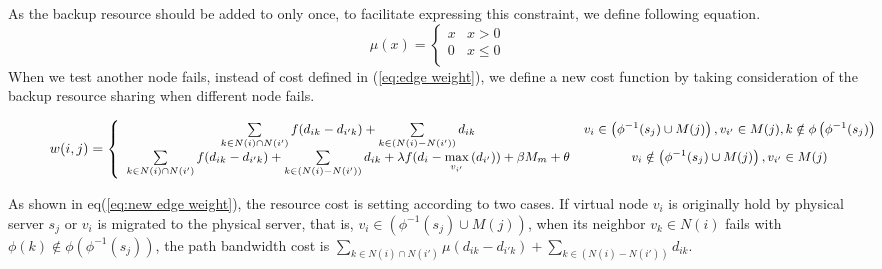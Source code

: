 As the backup resource should be added to only once, to facilitate expressing  this constraint, we define following equation.
\begin{equation}
\mu (x) = \left\{ {\begin{array}{*{20}{c}}
   x & {x > 0}  \\
   0 & {x \le 0}  \\
\end{array}} \right.
\end{equation}
When we test another node fails, instead of cost defined in (\ref{eq:edge weight}), we define a new cost function by taking consideration of the backup resource sharing when different node fails.
\begin{figure}
  \centering
    \begin{equation}
  \footnotesize
w(i,j) = \left\{ {\begin{array}{*{20}{c}}
   {\sum\limits_{k \in N(i) \cap N(i')} {f({d_{ik}} - {d_{i'k}})}  + \sum\limits_{k \in \left( {N(i) - N(i')} \right)} {{d_{ik}}} } & {{v_i} \in \left( {{\phi ^{ - 1}}({s_j}) \cup M(j)} \right),{v_{i'}} \in M(j),k \notin \phi \left( {{\phi ^{ - 1}}({s_j})} \right)}  \\
   {\sum\limits_{k \in N(i) \cap N(i')} {f({d_{ik}} - {d_{i'k}})}  + \sum\limits_{k \in \left( {N(i) - N(i')} \right)} {{d_{ik}}}  + \lambda f({d_i} - \mathop {\max }\limits_{{v_{i'}}} \left( {{d_{i'}}} \right)) + \beta {M_m} + \theta } & {{v_i} \notin \left( {{\phi ^{ - 1}}({s_j}) \cup M(j)} \right),{v_{i'}} \in M(j)}  \\
\end{array}} \right.
    \label{eq:new edge weight}
    \end{equation}
\end{figure}

As shown in  eq(\ref{eq:new edge weight}), the resource cost is setting according to two cases.  If virtual node $v_i$ is originally hold by  physical server $s_j$ or $v_i$ is migrated to the physical server, that is, ${{v_i} \in \left( {{\phi ^{ - 1}}({s_j}) \cup M(j)} \right)}$, when its neighbor $v_k \in N(i)$ fails with ${\phi \left( k \right) \notin \phi \left( {{\phi ^{ - 1}}({s_j})} \right)}$, the path bandwidth cost is ${\sum\limits_{k \in N(i) \cap N(i')} {\mu({d_{ik}} - {d_{i'k}})}  + \sum\limits_{k \in \left( {N(i) - N(i')} \right)} {{d_{ik}}} }$.

